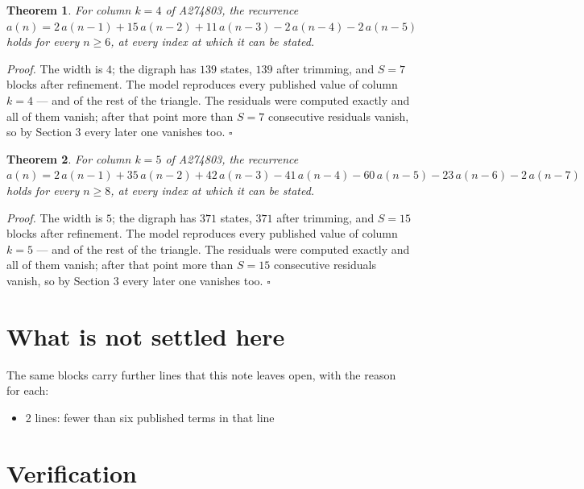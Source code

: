 \documentclass[11pt]{article}
\newtheorem{theorem}{Theorem}
\theoremstyle{definition}
\begin{document}
\begin{theorem} For column $k = 4$ of A274803, the recurrence $a(n) = 2\,a(n-1) + 15\,a(n-2) + 11\,a(n-3) - 2\,a(n-4) - 2\,a(n-5)$ holds for every $n \ge 6$, at every index at which it can be stated.\end{theorem}

{\itshape Proof.} The width is $4$; the digraph has $139$ states, $139$ after trimming, and $S = 7$ blocks after refinement. The model reproduces every published value of column $k = 4$ --- and of the rest of the triangle. The residuals were computed exactly and all of them vanish; after that point more than $S = 7$ consecutive residuals vanish, so by Section 3 every later one vanishes too. $\square$

\begin{theorem} For column $k = 5$ of A274803, the recurrence $a(n) = 2\,a(n-1) + 35\,a(n-2) + 42\,a(n-3) - 41\,a(n-4) - 60\,a(n-5) - 23\,a(n-6) - 2\,a(n-7)$ holds for every $n \ge 8$, at every index at which it can be stated.\end{theorem}

{\itshape Proof.} The width is $5$; the digraph has $371$ states, $371$ after trimming, and $S = 15$ blocks after refinement. The model reproduces every published value of column $k = 5$ --- and of the rest of the triangle. The residuals were computed exactly and all of them vanish; after that point more than $S = 15$ consecutive residuals vanish, so by Section 3 every later one vanishes too. $\square$

\section{What is not settled here}

The same blocks carry further lines that this note leaves open, with the reason for each:

\begin{itemize}

\item 2 lines: fewer than six published terms in that line

\end{itemize}

\section{Verification}
\end{document}
